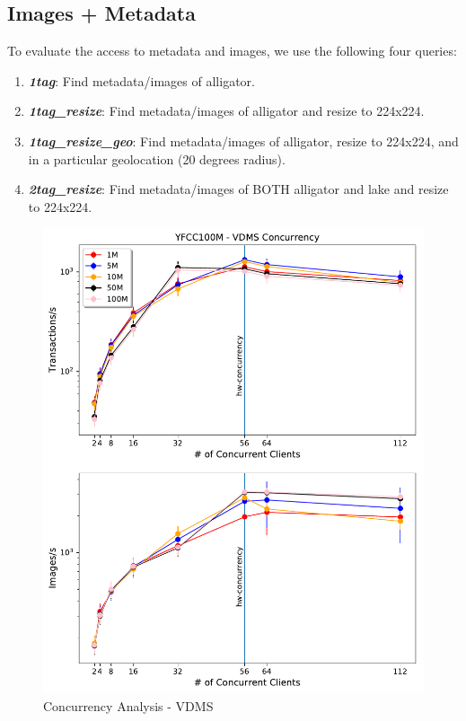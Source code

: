 \subsection{Images + Metadata}

To evaluate the access to metadata and images, we use the following four queries:
\begin{enumerate}
\item {\bf {\em 1tag}}: Find metadata/images of alligator.
\item {\bf {\em 1tag\_resize}}: Find metadata/images of alligator and resize to 224x224.
\item {\bf {\em 1tag\_resize\_geo}}: Find metadata/images of alligator, resize to 224x224, and in a particular geolocation (20 degrees radius).
\item {\bf {\em 2tag\_resize}}: Find metadata/images of BOTH alligator and lake and resize to 224x224.
\end{enumerate}

\begin{figure}[]
\centering
\includegraphics[width=\columnwidth]{figures/concurrency_vdms}
\caption{Concurrency Analysis - VDMS}
\label{fig:concurrency_vdms}
\end{figure}

